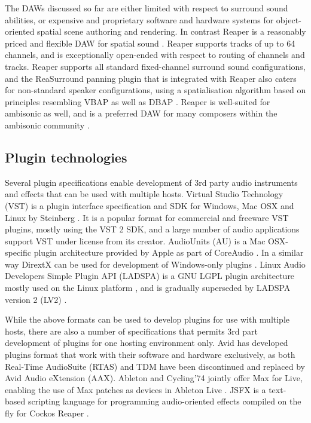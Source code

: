 \documentclass{article}
\begin{document}
The DAWs discussed so far are either limited with respect to surround sound abilities, or expensive and proprietary software and hardware systems for object-ori\-ented spatial scene authoring and rendering.
In contrast Reaper is a reasonably priced and flexible DAW for spatial sound \cite{cockos:2014reaper}.
Reaper supports tracks of up to 64 channels, and is exceptionally open-ended with respect to routing of channels and tracks.
Reaper supports all standard fixed-channel surround sound configurations, and the ReaSurround panning plugin that is integrated with Reaper also caters for non-standard speaker configurations, using a spatialisation algorithm based on principles resembling VBAP \cite{Pulkki:1997vbap} as well as DBAP \cite{Lossius:2009dbap}.
Reaper is well-suited for ambisonic as well, and is a preferred DAW for many composers within the ambisonic  community \cite{wiggins:2012reaperhowto}.





\subsection{Plugin technologies}

Several plugin specifications enable development of 3rd party audio instruments and effects that can be used with multiple hosts.
Virtual Studio Technology (VST) is a plugin interface specification and SDK for Windows, Mac OSX and Linux by Steinberg \cite{steinberg:2014vst}.
It is a popular format for commercial and freeware VST plugins, mostly using the VST 2 SDK, and a large number of audio applications support VST under license from its creator.
AudioUnits (AU) is a Mac OSX-specific plugin architecture provided by Apple as part of CoreAudio \cite{apple2014:au}.
In a similar way DirextX can be used for development of Windows-only plugins \cite{microsoft2014:directX}.
Linux Audio Developers Simple Plugin API (LADSPA) is a GNU LGPL plugin architecture mostly used on the Linux platform \cite{furse:2007ladspa}, and is gradually superseded by LADSPA version 2 (LV2) \cite{lv2:2014}.

While the above formats can be used to develop plugins for use with multiple hosts, there are also a number of specifications that permits 3rd part development of plugins for one hosting environment only.
Avid has developed plugins format that work with their software and hardware exclusively, as both Real-Time AudioSuite (RTAS) and TDM have been discontinued and replaced by Avid Audio eXtension (AAX).
Ableton and Cycling'74 jointly offer Max for Live, enabling the use of Max patches as devices in Ableton Live \cite{ableton:2014maxforlive}. JSFX is a text-based scripting language for programming audio-oriented effects compiled on the fly for Cockos Reaper \cite{cockos:2014jsfx,cockos:2014reaper}.
\end{document}
